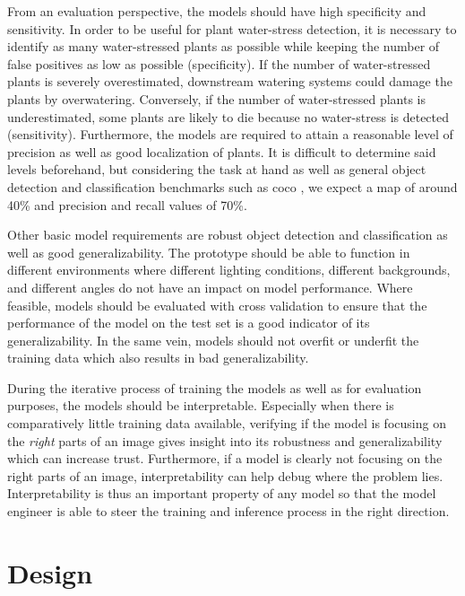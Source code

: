 \documentclass[final]{vutinfth} %
\begin{document}
From an evaluation perspective, the models should have high
specificity and sensitivity. In order to be useful for plant
water-stress detection, it is necessary to identify as many
water-stressed plants as possible while keeping the number of false
positives as low as possible (specificity). If the number of
water-stressed plants is severely overestimated, downstream watering
systems could damage the plants by overwatering. Conversely, if the
number of water-stressed plants is underestimated, some plants are
likely to die because no water-stress is detected (sensitivity).
Furthermore, the models are required to attain a reasonable level of
precision as well as good localization of plants. It is difficult to
determine said levels beforehand, but considering the task at hand as
well as general object detection and classification benchmarks such as
\gls{coco} \cite{lin2015}, we expect a \gls{map} of around 40\% and
precision and recall values of 70\%.

Other basic model requirements are robust object detection and
classification as well as good generalizability. The prototype should
be able to function in different environments where different lighting
conditions, different backgrounds, and different angles do not have an
impact on model performance. Where feasible, models should be
evaluated with cross validation to ensure that the performance of the
model on the test set is a good indicator of its generalizability. In
the same vein, models should not overfit or underfit the training data
which also results in bad generalizability.

During the iterative process of training the models as well as for
evaluation purposes, the models should be interpretable. Especially
when there is comparatively little training data available, verifying
if the model is focusing on the \emph{right} parts of an image gives
insight into its robustness and generalizability which can increase
trust. Furthermore, if a model is clearly not focusing on the right
parts of an image, interpretability can help debug where the problem
lies. Interpretability is thus an important property of any model so
that the model engineer is able to steer the training and inference
process in the right direction.

\section{Design}
\label{sec:design}
\end{document}
